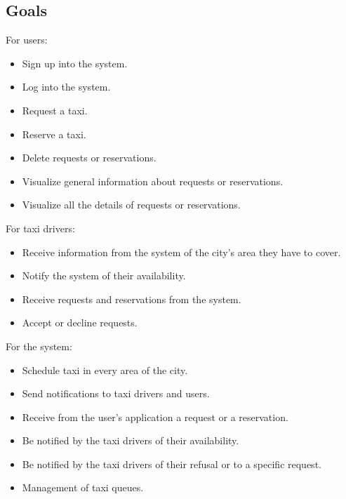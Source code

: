 \documentclass{article}
\begin{document}
	\subsection{Goals}
	For users:
	    \begin{itemize}
    	    \item Sign up into the system.
    	    \item Log into the system.
    	    \item Request a taxi.
    	    \item Reserve a taxi.
    	    \item Delete requests or reservations.
    	    \item Visualize general information about requests or reservations.
    	    \item Visualize all the details of requests or reservations.
	    \end{itemize}
	    
	For taxi drivers:
	    \begin{itemize}
    	    \item Receive information from the system of the city's area they have to cover.
	        \item Notify the system of their availability.
    	    \item Receive requests and reservations from the system.
    	    \item Accept or decline requests.
	    \end{itemize}
	   
	 For the system:
	    \begin{itemize}
    	    \item Schedule taxi in every area of the city.
    	    \item Send notifications to taxi drivers and users.
    	    \item Receive from the user's application a request or a reservation.
    	    \item Be notified by the taxi drivers of their availability.
    	    \item Be notified by the taxi drivers of their refusal or to a specific request.
    	    \item Management of taxi queues.
	    \end{itemize}
	    
\end{document}
